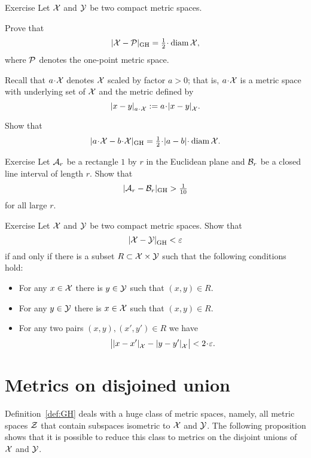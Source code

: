 \begin{thm}{Exercise}\label{ex:d_GH-and-diam}
Let $\mathcal{X}$ and $\mathcal{Y}$ be two compact metric spaces.

\begin{subthm}{}
Prove that 
$$|\spc{X}-\spc{P}|_{\GH}=\tfrac12\cdot \diam \spc{X},$$
where $\mathcal{P}$ denotes the one-point metric space.
\end{subthm}

Recall that $a\cdot\spc{X}$ denotes $\mathcal{X}$ scaled by factor $a>0$;
that is, $a\cdot\spc{X}$ is a metric space with underlying set of $\mathcal{X}$ and the metric defined by
\[\dist{x}{y}{a\cdot\spc{X}}\df a\cdot\dist{x}{y}{\spc{X}}.\]

\begin{subthm}{}
Show that 
\[|a\cdot\spc{X}-b\cdot \spc{X}|_{\GH}=\tfrac12\cdot|a-b|\cdot\diam\spc{X}.\]
\end{subthm}


\end{thm}

\begin{thm}{Exercise}\label{ex:rectangle}
Let $\mathcal{A}_r$ be a rectangle $1$ by $r$ in the Euclidean plane 
and $\mathcal{B}_r$ be a closed line interval of length $r$.
Show that 
\[|\mathcal{A}_r-\mathcal{B}_r|_{\operatorname{\rm GH}\nolimits}>\tfrac1{10}\]
for all large $r$.
\end{thm}

\begin{thm}{Exercise}
Let $\mathcal{X}$ and $\mathcal{Y}$ be two compact metric spaces.
Show that
\[\dist{\spc{X}}{\spc{Y}}{\GH}<\eps\]
if and only if there is a subset $R\subset \mathcal{X}\times\mathcal{Y}$ such that the following conditions hold:
\begin{itemize}
 \item For any $x\in  \mathcal{X}$ there is $y\in \mathcal{Y}$ such that $(x,y)\in R$.
 \item For any $y\in  \mathcal{Y}$ there is $x\in \mathcal{X}$ such that $(x,y)\in R$.
  \item For any two pairs $(x,y), (x',y')\in R$ we have
  \[\bigl|\dist{x}{x'}{\spc{X}}-\dist{y}{y'}{\spc{X}}\bigr|<2\cdot\eps.\]
\end{itemize}

\end{thm}


\section{Metrics on disjoined union}

Definition~\ref{def:GH} deals with a huge class of metric spaces,
namely, all metric spaces $\mathcal{Z}$ that contain subspaces isometric to $\mathcal{X}$ and $\mathcal{Y}$.
The following proposition shows that it is possible to reduce this class to metrics on the disjoint unions of $\mathcal{X}$ and $\mathcal{Y}$. 

